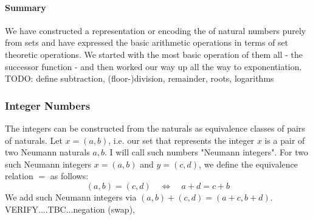 \paragraph{Summary} We have constructed a representation or encoding the of natural numbers purely from sets and have expressed the basic arithmetic operations in terms of set theoretic operations. We started with the most basic operation of them all - the successor function - and then worked our way up all the way to exponentiation. TODO: define subtraction, (floor-)division, remainder, roots, logarithms










\subsubsection{Integer Numbers} The integers can be constructed from the naturals as equivalence classes of pairs of naturals. Let $x = (a,b)$, i.e. our set that represents the integer $x$ is a pair of two Neumann naturals $a,b$. I will call such numbers "Neumann integers". For two such Neumann integers $x = (a,b)$ and $y = (c,d)$, we define the equivalence relation $=$ as follows:
\begin{equation}
(a,b) = (c,d) \quad \Leftrightarrow  \quad a+d = c+b
\end{equation}
We add such Neumann integers via $(a,b)+(c,d) = (a+c,b+d)$. VERIFY....TBC...negation (swap),

